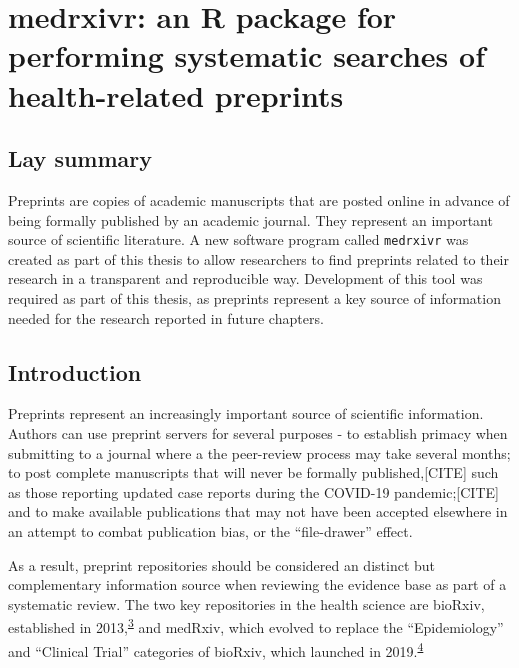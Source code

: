 \documentclass[a4paper, twoside]{templates/ociamthesis}
\begin{document}
\hypertarget{sys-rev-tools-heading}{%
\chapter{medrxivr: an R package for performing systematic searches of health-related preprints}\label{sys-rev-tools-heading}}

\minitoc 

\hypertarget{lay-summary}{%
\section{Lay summary}\label{lay-summary}}

Preprints are copies of academic manuscripts that are posted online in advance of being formally published by an academic journal.
They represent an important source of scientific literature.
A new software program called \texttt{medrxivr} was created as part of this thesis to allow researchers to find preprints related to their research in a transparent and reproducible way.
Development of this tool was required as part of this thesis, as preprints represent a key source of information needed for the research reported in future chapters.

\hypertarget{introduction}{%
\section{Introduction}\label{introduction}}

Preprints represent an increasingly important source of scientific information. Authors can use preprint servers for several purposes - to establish primacy when submitting to a journal where a the peer-review process may take several months; to post complete manuscripts that will never be formally published,{[}CITE{]} such as those reporting updated case reports during the COVID-19 pandemic;{[}CITE{]} and to make available publications that may not have been accepted elsewhere in an attempt to combat publication bias, or the ``file-drawer'' effect.

As a result, preprint repositories should be considered an distinct but complementary information source when reviewing the evidence base as part of a systematic review. The two key repositories in the health science are bioRxiv, established in 2013,\textsuperscript{\protect\hyperlink{ref-sever2019}{3}} and medRxiv, which evolved to replace the ``Epidemiology'' and ``Clinical Trial'' categories of bioRxiv, which launched in 2019.\textsuperscript{\protect\hyperlink{ref-rawlinson2019}{4}}
\end{document}
